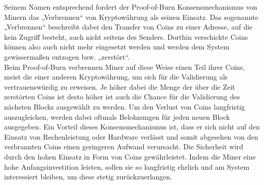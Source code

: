 Seinem Namen entsprechend fordert der Proof-of-Burn Konsensmechanismus von Minern das „Verbrennen“ von Kryptowährung als seinen Einsatz. Das sogenannte „Verbrennen“ beschreibt dabei den Transfer von Coins zu einer Adresse, auf die kein Zugriff besteht, auch nicht seitens des Senders. Dorthin verschickte Coins können also auch nicht mehr eingesetzt werden und werden dem System gewissermaßen entzogen bzw. „zerstört“.\\
Beim Proof-of-Burn verbrennen Miner auf diese Weise einen Teil ihrer Coins, meist die einer anderen Kryptowährung, um sich für die Validierung als vertrauenswürdig zu erweisen. Je höher dabei die Menge der über die Zeit zerstörten Coins ist desto höher ist auch die Chance für die Validierung des nächsten Blocks ausgewählt zu werden. Um den Verlust von Coins langfristig auszugleichen, werden dabei oftmals Belohnungen für jeden neuen Block ausgegeben.
Ein Vorteil dieses Konsensmechanismus ist, dass er sich nicht auf den Einsatz von Rechenleistung oder Hardware verlässt und somit abgesehen von den verbrannten Coins einen geringeren Aufwand verursacht. Die Sicherheit wird durch den hohen Einsatz in Form von Coins gewährleistet. Indem die Miner eine hohe Anfangsinvestition leisten, sollen sie so langfristig ehrlich und am System interessiert bleiben, um diese stetig zurückzuerlangen.